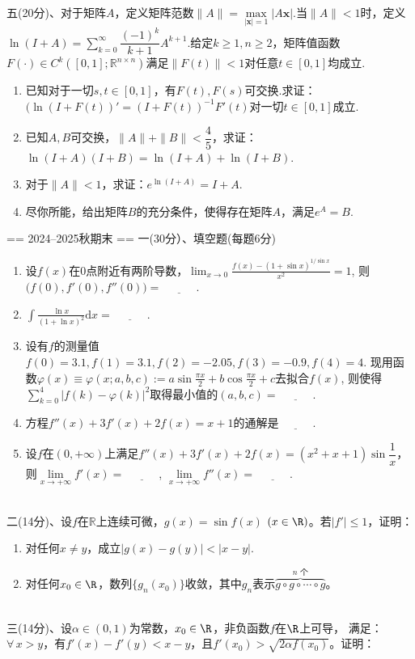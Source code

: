 ~\\
五(20分)、对于矩阵$A$，定义矩阵范数$\|A\|=\max\limits_{\mathbf{|x|}=1}|A\mathbf{x}|$.当$\|A\|<1$时，定义$\ln (I+A)=\sum\limits_{k=0}^{\infty}\dfrac{(-1)^k}{k+1}A^{k+1}$.给定$k\ge 1,n\ge 2$，矩阵值函数$F(\cdot)\in C^k([0,1];\mathbb{R}^{n\times n})$满足$\|F(t)\|<1$对任意$t\in [0,1]$均成立.
\begin{enumerate}
    \item 已知对于一切$s,t\in[0,1]$，有$F(t),F(s)$可交换.求证：
    $(\ln(I+F(t))'=(I+F(t))^{-1}F'(t)$对一切$t\in [0,1]$成立.
    \item 已知$A,B$可交换，$\|A\|+\|B\|<\dfrac{4}{5}$，求证：$\ln(I+A)(I+B)=\ln(I+A)+\ln(I+B)$.
    \item 对于$\|A\|<1$，求证：$e^{\ln (I+A)}=I+A$.
    \item 尽你所能，给出矩阵$B$的充分条件，使得存在矩阵$A$，满足$e^A=B$.
\end{enumerate}

== 2024--2025秋期末 ==
一(30分）、填空题(每题6分)
\begin{enumerate}[label=(\arabic*)]
\item 设$f(x)$在$0$点附近有两阶导数，$\displaystyle\lim_{x\rightarrow 0}\frac{f(x)-(1+\sin x)^{1/\sin x}}{x^2}=1$,
则$\big(f(0),f'(0),f''(0)\big)=\underline{\qquad\quad}$.
\item $\displaystyle\int\frac{\ln x}{(1+\ln x)^2}\mathrm{d}x=\underline{\qquad\quad}$.
\item 设有$f$的测量值$f(0)=3.1,f(1)=3.1,f(2)=-2.05,f(3)=-0.9,f(4)=4$.
现用函数$\varphi(x)\equiv\varphi(x;a,b,c):=a\sin\frac{\pi x}{2}+b\cos\frac{\pi x}{2}+c$去拟合$f(x)$,
则使得$\displaystyle\sum_{k=0}^4|f(k)-\varphi(k)|^2$取得最小值的$(a,b,c)=\underline{\qquad\quad}$.
\item 方程$f''(x)+3f'(x)+2f(x)=x+1$的通解是$\underline{\qquad\quad}$.
\item 设$f$在$(0,+\infty)$上满足$f''(x)+3f'(x)+2f(x)=(x^2+x+1)\sin\dfrac{1}{x}$，
则$\lim\limits_{x\rightarrow+\infty}f'(x)=\underline{\qquad\quad}$,
$\lim\limits_{x\rightarrow+\infty}f''(x)=\underline{\qquad\quad}$.
\end{enumerate}
~\\
二(14分)、设$f$在$\mathbb{R}$上连续可微，$g(x)=\sin f(x)$ $(x\in\R)$。若$|f'|\leq1$，证明：
\begin{enumerate}[label=(\arabic*)]
\item 对任何$x\neq y$，成立$|g(x)-g(y)|<|x-y|$.
\item 对任何$x_0\in\R$，数列$\{g_n(x_0)\}$收敛，其中$g_n$表示$\overbrace{g\circ g\circ \cdots\circ g}^{n\text{ 个}}$。
\end{enumerate}
~\\
三(14分)、设$\alpha\in(0,1)$为常数，$x_0\in\R$，非负函数$f$在$\R$上可导，
满足：$\forall\,x>y$，有$f'(x)-f'(y)<x-y$，且$f'(x_0)>\sqrt{2\alpha f(x_0)}$。证明：

